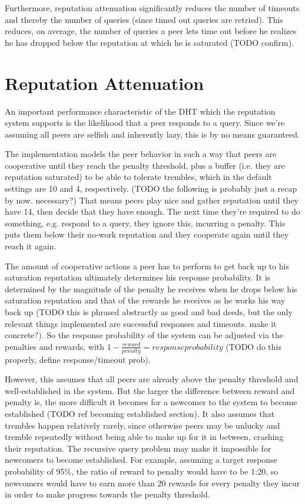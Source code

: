 Furthermore, reputation attenuation significantly reduces the number of timeouts
and thereby the number of queries (since timed out queries are retried). This
reduces, on average, the number of queries a peer lets time out before he
realizes he has dropped below the reputation at which he is saturated (TODO
confirm).

\section{Reputation Attenuation}
\label{sec:attenuation}
An important performance characteristic of the \ac{DHT} which the reputation
system supports is the likelihood that a peer responds to a query. Since we're
assuming all peers are selfish and inherently lazy, this is by no means
guaranteed.

The implementation models the peer behavior in such a way that peers are
cooperative until they reach the penalty threshold, plus a buffer (i.e. they are
reputation saturated) to be able to tolerate trembles, which in the default
settings are 10 and 4, respectively. (TODO the following is probably just a
recap by now. necessary?) That means peers play nice and gather reputation until
they have 14, then decide that they have enough. The next time they're required
to do something, e.g. respond to a query, they ignore this, incurring a penalty.
This puts them below their no-work reputation and they cooperate again until
they reach it again.

The amount of cooperative actions a peer has to perform to get back up to his
saturation reputation ultimately determines his response probability. It is
determined by the magnitude of the penalty he receives when he drops below his
saturation reputation and that of the rewards he receives as he works his way
back up (TODO this is phrased abstractly as good and bad deeds, but the only
relevant things implemented are successful responses and timeouts. make it
concrete?). So the response probability of the system can be adjusted via the
penalties and rewards, with $1 - \frac{reward}{penalty} = response probability$
(TODO do this properly, define response/timeout prob).

However, this assumes that all peers are already above the penalty threshold and
well-established in the system. But the larger the difference between reward and
penalty is, the more difficult it becomes for a newcomer to the system to become
established (TODO ref becoming established section). It also assumes that
trembles happen relatively rarely, since otherwise peers may be unlucky and
tremble repeatedly without being able to make up for it in between, crashing
their reputation. The recursive query problem may make it impossible for
newcomers to become established. For example, assuming a target response
probability of 95\%, the ratio of reward to penalty would have to be 1:20, so
newcomers would have to earn more than 20 rewards for every penalty they incur
in order to make progress towards the penalty threshold.

